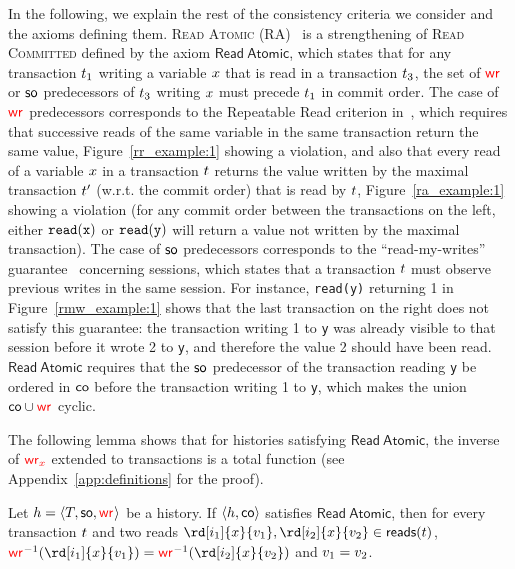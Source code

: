 In the following, we explain the rest of the consistency criteria we consider and the axioms defining them. \textsc{Read Atomic} (RA)~\cite{DBLP:conf/concur/Cerone0G15} is a strengthening of \textsc{Read Committed} defined by the axiom $\mathsf{Read\ Atomic}$, which states that for any transaction $\tr_1$ writing a variable $\xvar$ that is read in a transaction $\tr_3$, the set of $\wro$ or $\so$ predecessors of $\tr_3$ writing $\xvar$ must precede $\tr_1$ in commit order. The case of $\wro$ predecessors corresponds to the Repeatable Read criterion in~\cite{DBLP:conf/sigmod/BerensonBGMOO95}, which requires that successive reads of the same variable in the same transaction return the same value, Figure~\ref{rr_example:1} showing a violation, and also that every read of a variable $\xvar$ in a transaction $\tr$ returns the value written by the maximal transaction $\tr'$ (w.r.t. the commit order) that is read by $\tr$, Figure~\ref{ra_example:1} showing a violation (for any commit order between the transactions on the left, either ${\tt read(x)}$ or ${\tt read(y)}$ will return a value not written by the maximal transaction). The case of $\so$ predecessors corresponds to the  ``read-my-writes'' guarantee~\cite{DBLP:conf/pdis/TerryDPSTW94} concerning sessions, which states that a transaction $\tr$ must observe previous writes in the same session. For instance, {\tt read(y)} returning 1 in Figure~\ref{rmw_example:1} shows that the last transaction on the right does not satisfy this guarantee: the transaction writing 1 to {\tt y} was already visible to that session before it wrote 2 to {\tt y}, and therefore the value 2 should have been read. $\mathsf{Read\ Atomic}$ requires that the $\so$ predecessor of the transaction reading {\tt y} be ordered in $\co$ before the transaction writing 1 to {\tt y}, which makes the union $\co\cup\wro$ cyclic.

The following lemma shows that for histories satisfying $\mathsf{Read\ Atomic}$, the inverse of $\wro[\xvar]$ extended to transactions is a total function (see Appendix~\ref{app:definitions} for the proof).

\begin{lemma}
 Let $\hist=\tup{T, \so, \wro}$ be a history. 
 If $\tup{\hist,\co}$ satisfies $\mathsf{Read\ Atomic}$, then %
 for every transaction $\tr$ and two reads $\rd[\id_1]{\xvar}{\val_1},\rd[\id_2]{\xvar}{\val_2}\in \readOp{\tr}$, $\wro^{-1}(\rd[\id_1]{\xvar}{\val_1})=\wro^{-1}(\rd[\id_2]{\xvar}{\val_2})$ and $\val_1 = \val_2$.
\end{lemma}

